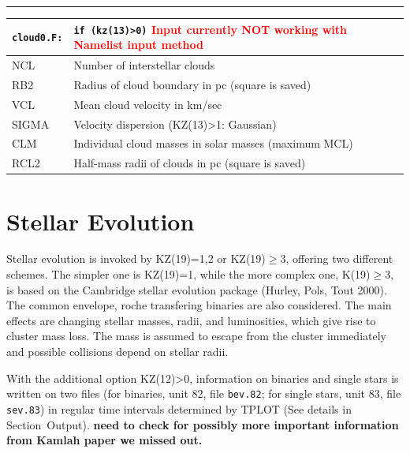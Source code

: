 
\hrule
\noindent
\begin{longtable}{@{}p{1.5cm}p{13.0cm}}
\texttt{cloud0.F:}& \texttt{if (kz(13)>0)} 
\textcolor{red}{Input currently NOT working with Namelist input method}
\\\hline
%
NCL   &  Number of interstellar clouds \\
RB2   &  Radius of cloud boundary in pc (square is saved) \\
VCL   &  Mean cloud velocity in km/sec \\
SIGMA &  Velocity dispersion (KZ(13)>1: Gaussian) \\
CLM   &  Individual cloud masses in solar masses (maximum MCL) \\
RCL2  &  Half-mass radii of clouds in pc (square is saved) \\
\end{longtable}

\vspace{1cm}

\section*{Stellar Evolution}

Stellar evolution is invoked by KZ(19)=1,2 or KZ(19)$\ge$3, offering two different
schemes.
The simpler one is KZ(19)=1, while the more complex one, K(19)$\ge$3,
is based on the Cambridge stellar evolution package
(Hurley, Pols, Tout 2000). The common envelope, roche transfering binaries are also considered. 
The main effects are changing stellar masses, radii, and luminosities,
which give rise to cluster mass loss.
The mass is assumed to escape from the cluster immediately and
possible collisions depend on stellar radii.

With the additional option KZ(12)>0, information on binaries and
single stars is written on two files (for binaries, unit 82, file \texttt{bev.82}; for single stars,
unit 83, file \texttt{sev.83}) in regular time intervals determined by
TPLOT (See details in Section~Output).
{\bf need to check for possibly more important information from Kamlah paper we missed out.}


